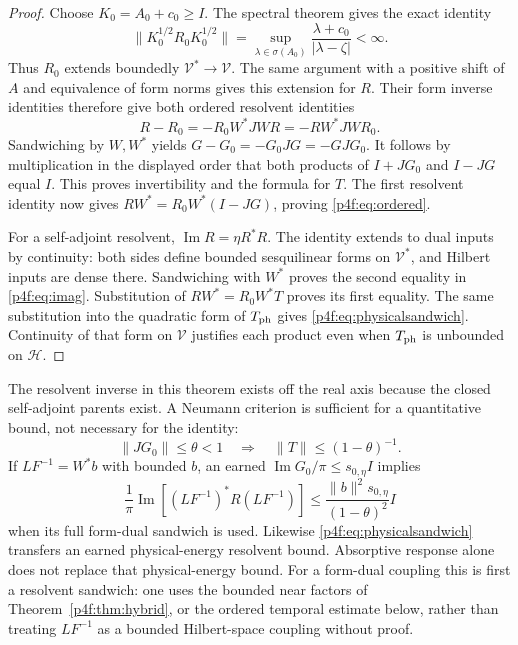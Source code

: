 \documentclass[11pt]{article}
\numberwithin{equation}{section}
\theoremstyle{definition}
\theoremstyle{remark}
\begin{document}
\begin{proof}
Choose $K_0=A_0+c_0\ge I$. The spectral theorem gives
the exact identity
\begin{equation}\label{p4f:eq:spectralsup}
 \|K_0^{1/2}R_0K_0^{1/2}\|
  =\sup_{\lambda\in\sigma(A_0)}
                  \frac{\lambda+c_0}{|\lambda-\zeta|}<\infty .
\end{equation}
Thus $R_0$ extends boundedly $\mathcal V^*\to\mathcal V$.
The same argument with a positive shift of $A$ and
equivalence of form norms gives this extension for $R$.
Their form inverse identities therefore give both
ordered resolvent identities
\[
 R-R_0=-R_0W^*JWR=-RW^*JWR_0.
\]
Sandwiching by $W,W^*$ yields
$G-G_0=-G_0JG=-GJG_0$.
It follows by multiplication in the displayed order
that both products of $I+JG_0$ and $I-JG$ equal $I$.
This proves invertibility and the formula for $T$.
The first resolvent identity now gives
$RW^*=R_0W^*(I-JG)$, proving \eqref{p4f:eq:ordered}.

For a self-adjoint resolvent,
$\operatorname{Im}R=\eta R^*R$. The identity extends
to dual inputs by continuity: both sides define
bounded sesquilinear forms on $\mathcal V^*$, and
Hilbert inputs are dense there. Sandwiching with
$W^*$ proves the second equality in
\eqref{p4f:eq:imag}. Substitution of
$RW^*=R_0W^*T$ proves its first equality.
The same substitution into the quadratic form of
$T_{\rm ph}$ gives \eqref{p4f:eq:physicalsandwich}.
Continuity of that form on $\mathcal V$ justifies
each product even when $T_{\rm ph}$ is unbounded
on $\mathcal H$.
\end{proof}

The resolvent inverse in this theorem exists off the
real axis because the closed self-adjoint parents
exist. A Neumann criterion is sufficient for a
quantitative bound, not necessary for the identity:
\begin{equation}\label{p4f:eq:neumann}
 \|JG_0\|\le\theta<1\quad\Longrightarrow\quad
                       \|T\|\le(1-\theta)^{-1}.
\end{equation}
If $LF^{-1}=W^*b$ with bounded $b$, an earned
$\operatorname{Im}G_0/\pi\le s_{0,\eta}I$ implies
\[
 \frac1\pi\operatorname{Im}
       [(LF^{-1})^*R(LF^{-1})]
 \le \frac{\|b\|^2s_{0,\eta}}{(1-\theta)^2}I
\]
when its full form-dual sandwich is used. Likewise
\eqref{p4f:eq:physicalsandwich} transfers an earned
physical-energy resolvent bound. Absorptive response
alone does not replace that physical-energy bound.
For a form-dual coupling this is first a resolvent
sandwich: one uses the bounded near factors of
Theorem~\ref{p4f:thm:hybrid}, or the ordered temporal
estimate below, rather than treating $LF^{-1}$ as
a bounded Hilbert-space coupling without proof.
\end{document}
